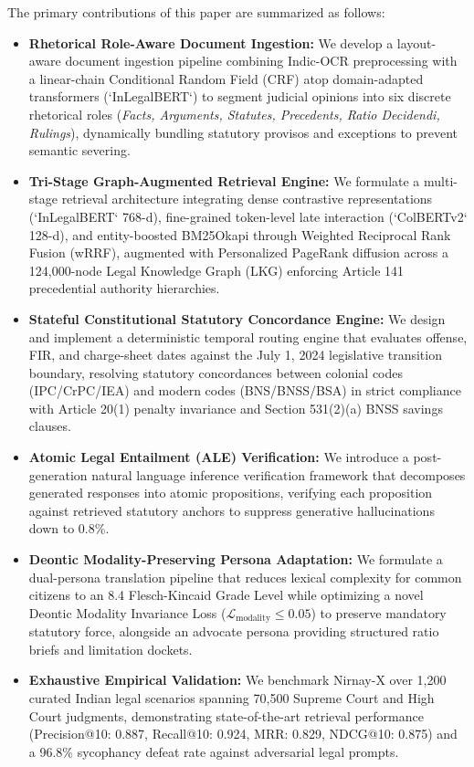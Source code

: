 \documentclass[conference]{IEEEtran}
\begin{document}
The primary contributions of this paper are summarized as follows:
\begin{itemize}
    \item \textbf{Rhetorical Role-Aware Document Ingestion:} We develop a layout-aware document ingestion pipeline combining Indic-OCR preprocessing with a linear-chain Conditional Random Field (CRF) atop domain-adapted transformers (`InLegalBERT`) to segment judicial opinions into six discrete rhetorical roles (\textit{Facts, Arguments, Statutes, Precedents, Ratio Decidendi, Rulings}), dynamically bundling statutory provisos and exceptions to prevent semantic severing.
    \item \textbf{Tri-Stage Graph-Augmented Retrieval Engine:} We formulate a multi-stage retrieval architecture integrating dense contrastive representations (`InLegalBERT` 768-d), fine-grained token-level late interaction (`ColBERTv2` 128-d), and entity-boosted BM25Okapi through Weighted Reciprocal Rank Fusion (wRRF), augmented with Personalized PageRank diffusion across a 124,000-node Legal Knowledge Graph (LKG) enforcing Article 141 precedential authority hierarchies.
    \item \textbf{Stateful Constitutional Statutory Concordance Engine:} We design and implement a deterministic temporal routing engine that evaluates offense, FIR, and charge-sheet dates against the July 1, 2024 legislative transition boundary, resolving statutory concordances between colonial codes (IPC/CrPC/IEA) and modern codes (BNS/BNSS/BSA) in strict compliance with Article 20(1) penalty invariance and Section 531(2)(a) BNSS savings clauses.
    \item \textbf{Atomic Legal Entailment (ALE) Verification:} We introduce a post-generation natural language inference verification framework that decomposes generated responses into atomic propositions, verifying each proposition against retrieved statutory anchors to suppress generative hallucinations down to 0.8\%.
    \item \textbf{Deontic Modality-Preserving Persona Adaptation:} We formulate a dual-persona translation pipeline that reduces lexical complexity for common citizens to an 8.4 Flesch-Kincaid Grade Level while optimizing a novel Deontic Modality Invariance Loss ($\mathcal{L}_{\text{modality}} \le 0.05$) to preserve mandatory statutory force, alongside an advocate persona providing structured ratio briefs and limitation dockets.
    \item \textbf{Exhaustive Empirical Validation:} We benchmark Nirnay-X over 1,200 curated Indian legal scenarios spanning 70,500 Supreme Court and High Court judgments, demonstrating state-of-the-art retrieval performance (Precision@10: 0.887, Recall@10: 0.924, MRR: 0.829, NDCG@10: 0.875) and a 96.8\% sycophancy defeat rate against adversarial legal prompts.
\end{itemize}
\end{document}
